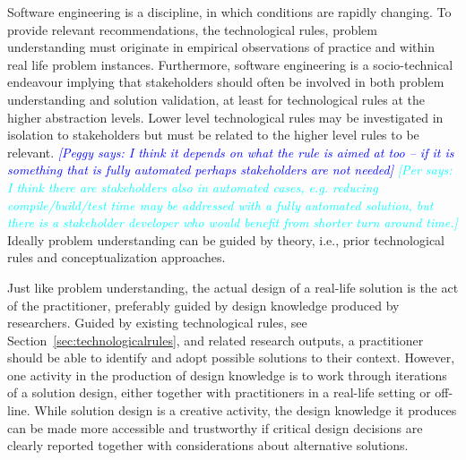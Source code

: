 \documentclass[graybox]{svmult}
\newcommand{\peggy}[1]{\textcolor{blue}{{\it [Peggy says: #1]}}}
\newcommand{\per}[1]{\textcolor{cyan}{{\it [Per says: #1]}}}
\newcommand{\peggy}[1]{}
\newcommand{\per}[1]{}
\begin{document}
Software engineering is a discipline, in which conditions are rapidly changing. To provide relevant recommendations, the technological rules,  problem understanding must originate in empirical observations of practice and within real life problem instances. Furthermore, software engineering is a socio-technical endeavour implying that stakeholders should often be involved in both problem understanding and solution validation, at least for technological rules at the higher abstraction levels. Lower level technological rules may be investigated in isolation to stakeholders but must be related to the higher level rules to be relevant. 
\peggy{I think it depends on what the rule is aimed at too -- if it is something that is fully automated perhaps stakeholders are not needed} \per{I think there are stakeholders also in automated cases, e.g. reducing compile/build/test time may be addressed with a fully automated solution, but there is a stakeholder developer who would benefit from shorter turn around time.}
Ideally problem understanding can be guided by theory, i.e., prior technological rules and conceptualization approaches. 







Just like problem understanding, the actual design of a real-life solution is the act of the practitioner, preferably guided by design knowledge produced by researchers. %
Guided by existing technological rules, see Section~\ref{sec:technologicalrules}, and related research outputs, a practitioner should be able to identify and adopt possible solutions to their context. However, one activity in the production of design knowledge is to work through iterations of a solution design, either together with practitioners in a real-life setting or off-line. %
While solution design is a creative activity, the design knowledge it produces can be made more accessible and trustworthy if critical design decisions are clearly reported together with considerations about alternative solutions.
\end{document}
